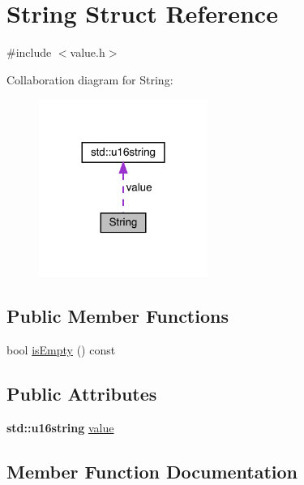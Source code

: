 \hypertarget{struct_string}{}\section{String Struct Reference}
\label{struct_string}


{\ttfamily \#include $<$value.\+h$>$}



Collaboration diagram for String\+:
\nopagebreak
\begin{figure}[H]
\begin{center}
\leavevmode
\includegraphics[width=156pt]{struct_string__coll__graph}
\end{center}
\end{figure}
\subsection*{Public Member Functions}
\begin{DoxyCompactItemize}
\item 
bool \hyperlink{struct_string_a47438e7b744f5b96be767302c525b351}{is\+Empty} () const
\end{DoxyCompactItemize}
\subsection*{Public Attributes}
\begin{DoxyCompactItemize}
\item 
\textbf{ std\+::u16string} \hyperlink{struct_string_a8d279ee262f09d4e861c4578f85df015}{value}
\end{DoxyCompactItemize}


\subsection{Member Function Documentation}
\mbox{\label{struct_string_a47438e7b744f5b96be767302c525b351}} 
